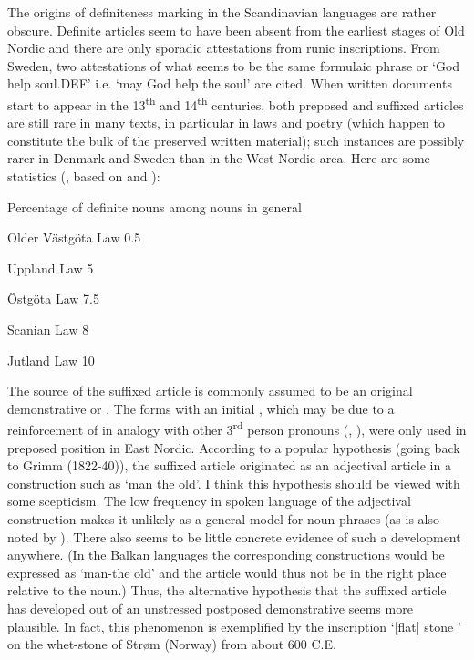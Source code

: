 The origins of definiteness marking in the Scandinavian languages are rather obscure. Definite articles seem to have been absent from the earliest stages of Old Nordic and there are only sporadic attestations from runic inscriptions. From Sweden, two attestations of what seems to be the same formulaic phrase or ‘God help soul.DEF’ i.e. ‘may God help the soul’ are cited. When written documents start to appear in the 13\textsuperscript{th} and 14\textsuperscript{th} centuries, both preposed and suffixed articles are still rare in many texts, in particular in laws and poetry (which happen to constitute the bulk of the preserved written material); such instances are possibly rarer in Denmark and Sweden than in the West Nordic area. Here are some statistics (\citet[938]{Delsing2002}, based on \citet{Larm1936} and \citet{Skautrup1944}): 

\begin{table}
\caption{ Percentage of definite nouns among nouns in general}
\label{tab:1}
\end{table}

Older Västgöta Law  0.5

Uppland Law  5

Östgöta Law  7.5

Scanian Law  8

Jutland Law  10

The source of the suffixed article is commonly assumed to be an original demonstrative  or . The forms with an initial , which may be due to a reinforcement of  in analogy with other 3\textsuperscript{rd} person pronouns (\citet[135]{Perridon1989}, \citet[723]{Syrett2002}), were only used in preposed position in East Nordic. According to a popular hypothesis (going back to Grimm (1822-40)), the suffixed article originated as an adjectival article in a construction such as ‘man the old’. I think this hypothesis should be viewed with some scepticism. The low frequency in spoken language of the adjectival construction makes it unlikely as a general model for noun phrases (as is also noted by \citet[63]{SaltveitEtAl1971}). There also seems to be little concrete evidence of such a development anywhere. (In the Balkan languages the corresponding constructions would be expressed as ‘man-the old’ and the article would thus not be in the right place relative to the noun.)  Thus, the alternative hypothesis that the suffixed article has developed out of an unstressed postposed demonstrative seems more plausible.  In fact, this phenomenon is exemplified by the inscription  ‘[flat] stone ’ on the whet-stone of Strøm (Norway) from about 600 C.E. 

